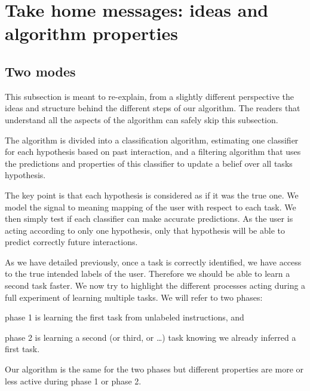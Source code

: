 \section{Take home messages: ideas and algorithm properties}

\subsection{Two modes}

This subsection is meant to re-explain, from a slightly different perspective the ideas and structure behind the different steps of our algorithm. The readers that understand all the aspects of the algorithm can safely skip this subsection.

The algorithm is divided into a classification algorithm, estimating one classifier for each hypothesis based on past interaction, and a filtering algorithm that uses the predictions and properties of this classifier to update a belief over all tasks hypothesis.

The key point is that each hypothesis is considered as if it was the true one. We model the signal to meaning mapping of the user with respect to each task. We then simply test if each classifier can make accurate predictions. As the user is acting according to only one hypothesis, only that hypothesis will be able to predict correctly future interactions.


As we have detailed previously, once a task is correctly identified, we have access to the true intended labels of the user. Therefore we should be able to learn a second task faster. We now try to highlight the different processes acting during a full experiment of learning multiple tasks. We will refer to two phases: \begin{inparaenum}[a)] \item phase 1 is learning the first task from unlabeled instructions, and \item phase 2 is learning a second (or third, or \ldots) task knowing we already inferred a first task. \end{inparaenum} Our algorithm is the same for the two phases but different properties are more or less active during phase 1 or phase 2.

